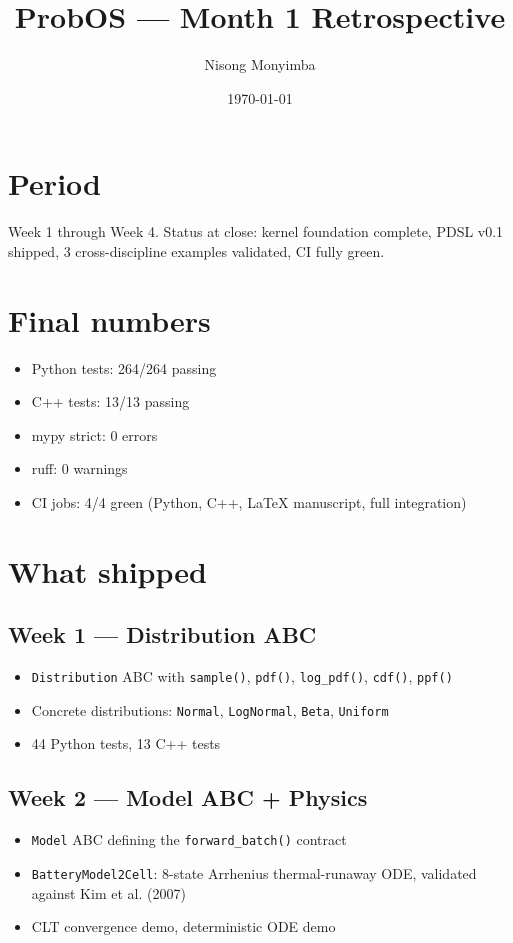 \documentclass[11pt]{article}
\title{ProbOS --- Month 1 Retrospective}
\author{Nisong Monyimba}
\date{\today}
\begin{document}
\maketitle

\section*{Period}
Week 1 through Week 4. Status at close: kernel foundation complete, PDSL
v0.1 shipped, 3 cross-discipline examples validated, CI fully green.

\section*{Final numbers}
\begin{itemize}[leftmargin=*]
  \item Python tests: 264/264 passing
  \item C++ tests: 13/13 passing
  \item mypy strict: 0 errors
  \item ruff: 0 warnings
  \item CI jobs: 4/4 green (Python, C++, LaTeX manuscript, full
    integration)
\end{itemize}

\section*{What shipped}

\subsection*{Week 1 --- Distribution ABC}
\begin{itemize}[leftmargin=*]
  \item \texttt{Distribution} ABC with \texttt{sample()}, \texttt{pdf()},
    \texttt{log\_pdf()}, \texttt{cdf()}, \texttt{ppf()}
  \item Concrete distributions: \texttt{Normal}, \texttt{LogNormal},
    \texttt{Beta}, \texttt{Uniform}
  \item 44 Python tests, 13 C++ tests
\end{itemize}

\subsection*{Week 2 --- Model ABC + Physics}
\begin{itemize}[leftmargin=*]
  \item \texttt{Model} ABC defining the \texttt{forward\_batch()} contract
  \item \texttt{BatteryModel2Cell}: 8-state Arrhenius thermal-runaway
    ODE, validated against Kim et al. (2007)
  \item CLT convergence demo, deterministic ODE demo
\end{itemize}
\end{document}
